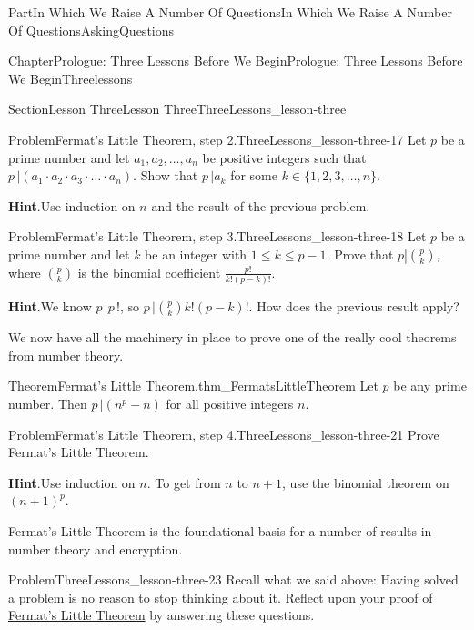 \documentclass[oneside,10pt,]{book}
\newcommand{\blocktitlefont}{\relax}
\numberwithin{equation}{part}
\begin{document}
\begin{partptx}{Part}{In Which We Raise A Number Of Questions}{}{In Which We Raise A Number Of Questions}{}{}{AskingQuestions}
\begin{chapterptx}{Chapter}{Prologue: Three Lessons Before We Begin}{}{Prologue: Three Lessons Before We Begin}{}{}{Threelessons}
\begin{sectionptx}{Section}{Lesson Three}{}{Lesson Three}{}{}{ThreeLessons_lesson-three}
\begin{problem}{Problem}{Fermat's Little Theorem, step 2.}{ThreeLessons_lesson-three-17}
 Let \(p\) be a prime number and let \(a_1, a_2, \ldots,
a_n\) be positive integers such that \(p\,|\left(a_1\cdot
a_2\cdot a_3\cdot\ldots\cdot a_n\right)\).  Show that \(p\,|a_k\) for some \(k\in\{1, 2, 3, \ldots, n\}\).%
\par\smallskip%
\noindent\textbf{\blocktitlefont Hint}.\hypertarget{ThreeLessons_lesson-three-17-3}{}\quad{}Use induction on \(n\) and the result of the previous problem.%
\end{problem}
\begin{problem}{Problem}{Fermat's Little Theorem, step 3.}{ThreeLessons_lesson-three-18}%
 Let \(p\) be a prime number and let \(k\) be an integer with \(1\le k\le p-1\).  Prove that \(p\left|{p
\choose{}k}\right.\), where \({p \choose{}k}\) is the binomial coefficient \(\frac{p!}{k!(p-k)!}\).%
\par\smallskip%
\noindent\textbf{\blocktitlefont Hint}.\hypertarget{ThreeLessons_lesson-three-18-3}{}\quad{}We know \(p\,|p\,!\), so \(p\,|{p \choose{}k}k!(p-k)!\). How does the previous result apply?%
\end{problem}
We now have all the machinery in place to prove one of the really cool theorems from number theory.%
\begin{theorem}{Theorem}{Fermat's Little Theorem.}{}{thm_FermatsLittleTheorem}%
%
Let \(p\) be any prime number.  Then \(p\,|(n^p-n)\) for all positive integers \(n\).%
\end{theorem}
\begin{problem}{Problem}{Fermat's Little Theorem, step 4.}{ThreeLessons_lesson-three-21}%
 Prove Fermat's Little Theorem.%
\par\smallskip%
\noindent\textbf{\blocktitlefont Hint}.\hypertarget{ThreeLessons_lesson-three-21-3}{}\quad{}Use induction on \(n\).  To get from \(n\) to \(n+1\), use the binomial theorem on \((n+1)^p\).%
\end{problem}
Fermat's Little Theorem is the foundational basis for a number of results in number theory and encryption.%
\begin{problem}{Problem}{}{ThreeLessons_lesson-three-23}%
Recall what we said above: Having solved a problem is no reason to stop thinking about it. Reflect upon your proof of \hyperref[thm_FermatsLittleTheorem]{Fermat's Little Theorem} by answering these questions.%

\end{problem}
\end{sectionptx}
\end{chapterptx}
\end{partptx}
\end{document}
